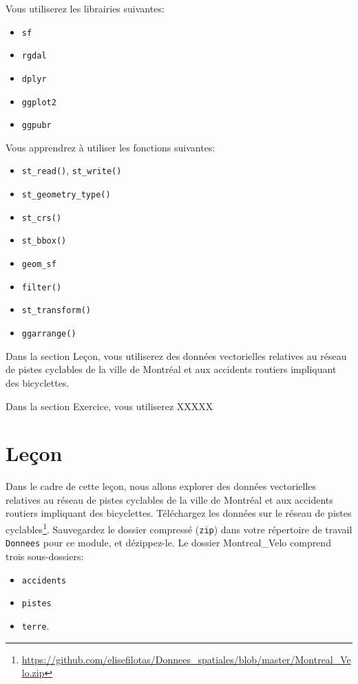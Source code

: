 \documentclass[
  12pt,
]{krantz}
\providecommand{\tightlist}{%
  \setlength{\itemsep}{0pt}\setlength{\parskip}{0pt}}
\renewcommand{\href}[2]{#2\footnote{\url{#1}}}
\begin{document}
Vous utiliserez les librairies suivantes:

\begin{itemize}
\tightlist
\item
  \texttt{sf}
\item
  \texttt{rgdal}
\item
  \texttt{dplyr}
\item
  \texttt{ggplot2}
\item
  \texttt{ggpubr}
\end{itemize}

Vous apprendrez à utiliser les fonctions suivantes:

\begin{itemize}
\tightlist
\item
  \texttt{st\_read()}, \texttt{st\_write()}
\item
  \texttt{st\_geometry\_type()}
\item
  \texttt{st\_crs()}
\item
  \texttt{st\_bbox()}
\item
  \texttt{geom\_sf}
\item
  \texttt{filter()}
\item
  \texttt{st\_transform()}
\item
  \texttt{ggarrange()}
\end{itemize}

Dans la section Leçon, vous utiliserez des données vectorielles relatives au réseau de pistes cyclables de la ville de Montréal et aux accidents routiers impliquant des bicyclettes.

Dans la section Exercice, vous utiliserez XXXXX

\hypertarget{leuxe7on-2}{%
\section{Leçon}\label{leuxe7on-2}}

Dans le cadre de cette leçon, nous allons explorer des données vectorielles relatives au réseau de pistes cyclables de la ville de Montréal et aux accidents routiers impliquant des bicyclettes.
Téléchargez les \href{https://github.com/elisefilotas/Donnees_spatiales/blob/master/Montreal_Velo.zip}{données sur le réseau de pistes cyclables}. Sauvegardez le dossier compressé (\texttt{zip}) dans votre répertoire de travail \texttt{Donnees} pour ce module, et dézippez-le. Le dossier Montreal\_Velo comprend trois sous-dossiers:

\begin{itemize}
\tightlist
\item
  \texttt{accidents}
\item
  \texttt{pistes}
\item
  \texttt{terre}.
\end{itemize}
\end{document}
